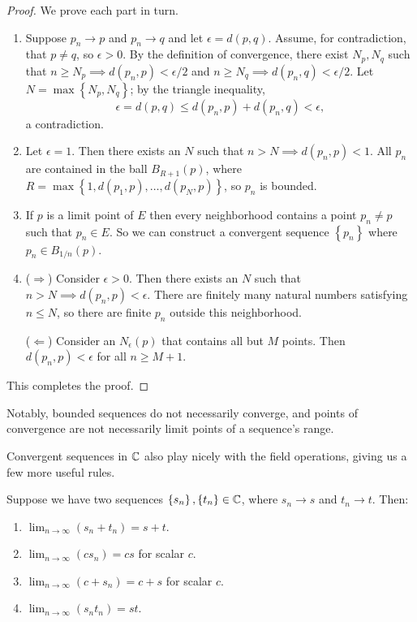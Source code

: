 \documentclass[../m131main.tex]{subfiles}
\begin{document}
\begin{proof}
    We prove each part in turn.
    \begin{enumerate}[label=(\alph*)]
        \item Suppose $p_n \to p$ and $p_n \to q$ and let $\epsilon = d(p,q)$.
        Assume, for contradiction, that $p \neq q$, so $\epsilon > 0$.
        By the definition of convergence, there exist $N_p, N_q$ such that $n \geq N_p \implies d(p_n, p) < \epsilon / 2$ and $n \geq N_q \implies d(p_n, q) < \epsilon / 2$.
        Let $N = \max \left\{ N_p, N_q \right\}$; by the triangle inequality,
        \[ \epsilon = d(p,q) \leq d(p_n, p) + d(p_n, q) < \epsilon, \]
        a contradiction.

        \item Let $\epsilon = 1$.
        Then there exists an $N$ such that $n > N \implies d(p_n, p) < 1$.
        All $p_n$ are contained in the ball $B_{R+1}(p)$, where $R = \max \left\{ 1, d(p_1, p), \ldots, d(p_N, p) \right\}$, so $p_n$ is bounded.

        \item If $p$ is a limit point of $E$ then every neighborhood contains a point $p_n \neq p$ such that $p_n \in E$.
        So we can construct a convergent sequence $\left\{ p_n \right\}$ where $p_n \in B_{1 / n}(p)$.

        \item ($\Rightarrow$)
        Consider $\epsilon > 0$.
        Then there exists an $N$ such that $n > N \implies d(p_n, p) < \epsilon$.
        There are finitely many natural numbers satisfying $n \leq N$, so there are finite $p_n$ outside this neighborhood.

        ($\Leftarrow$)
        Consider an $N_\epsilon (p)$ that contains all but $M$ points.
        Then $d(p_n, p) < \epsilon$ for all $n \geq M + 1$.
    \end{enumerate}
    This completes the proof.
\end{proof}

Notably, bounded sequences do not necessarily converge, and points of convergence are not necessarily limit points of a sequence's range.

Convergent sequences in $\mathbb{C}$ also play nicely with the field operations, giving us a few more useful rules.

\begin{theorem}
    Suppose we have two sequences $\left\{ s_n \right\}, \left\{ t_n \right\} \in \mathbb{C}$, where $s_n \to s$ and $t_n \to t$.
    Then:
    \begin{enumerate}[label=(\alph*)]
        \item $\lim_{n \to \infty} (s_n + t_n) = s + t$.
        \item $\lim_{n \to \infty} (cs_n) = cs$ for scalar $c$. 
        \item $\lim_{n \to \infty} (c + s_n) = c + s$ for scalar $c$.
        \item $\lim_{n \to \infty} (s_n t_n) = st$.
    \end{enumerate}
\end{theorem}
\end{document}
